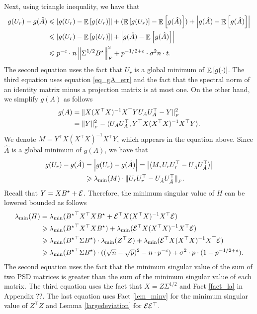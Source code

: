 	Next, using triangle inequality, we have that
	\begin{align}
		g(U_r) - g(\hat{A}) &\leqslant {\left| {g(U_r) - \mathop{\mathbb{E}}\left[ g(U_r) \right]} \right|} + (\mathop{\mathbb{E}}\left[ g(U_r) \right] - \mathop{\mathbb{E}}\left[ g(\hat{A}) \right]) + {\left| {g(\hat{A}) - \mathop{\mathbb{E}}\left[ g(\hat{A}) \right]} \right|} \nonumber \\
		&\leqslant {\left| {g(U_r) - \mathop{\mathbb{E}}\left[ g(U_r) \right]} \right|} +{\left| {g(\hat{A}) - \mathop{\mathbb{E}}\left[ g(\hat{A}) \right]} \right|} \nonumber \\
		&\leqslant p^{-c} \cdot n \left\| \Sigma^{1/2} B^{\star} \right\|_{F}^2 + p^{-1/2 + e}\cdot \sigma^2 n \cdot t. \label{eq_g_gap}
	\end{align}
	The second equation uses the fact that $U_r$ is a global minimum of $\mathop{\mathbb{E}}\left[ g(\cdot) \right]$.
	The third equation uses equation \eqref{eq_gA_err} and the fact that the spectral norm of an identity matrix minus a projection matrix is at most one.
	On the other hand, we simplify $g(A)$ as follows
	\begin{align*}
		g(A)  &= \|X (X^{\top}X)^{-1} X^{\top} Y U_A U_A^{\top} - Y\|_{_{F}}^2 \\
					&= \|Y\|_{_{F}}^2 - \langle U_A U_A^{\top}, Y^{\top} X (X^{\top} X)^{-1} X^{\top} Y \rangle.
	\end{align*}
	We denote $M = Y^{\top} X (X^{\top} X)^{-1} X^{\top} Y$, which appears in the equation above.
	Since $\hat{A}$ is a global minimum of $g(A)$, we have that
	\begin{align}
		g(U_r) - g(\hat{A}) &= \left\lvert g(U_r) - g(\hat{A})\right\rvert = \left\lvert\langle M, U_r U_r^{\top} - U_{\hat{A}} U_{\hat{A}}^{\top} \rangle\right\rvert \nonumber \\
												&\geqslant \lambda_{\min}(M) \cdot \|U_r U_r^{\top} - U_{\hat{A}} U_{\hat{A}}^{\top}\|_{_{F}}. \label{eq_g_gap1}
	\end{align}
	Recall that $Y = X B^{\star} + \mathcal{E}$. Therefore, the minimum singular value of $H$ can be lowered bounded as follows
	\begin{align}
		\lambda_{\min}(H) &= \lambda_{\min}({B^{\star}}^{\top} X^{\top} X B^{\star} + \mathcal{E}^{\top} X (X^{\top} X)^{-1} X^{\top} \mathcal{E}) \nonumber \\
		&\geqslant \lambda_{\min}({B^{\star}}^{\top}X^{\top}X B^{\star}) + \lambda_{\min}(\mathcal{E}^{\top} X (X^{\top} X)^{-1} X^{\top} \mathcal{E}) \nonumber \\
		&\geqslant \lambda_{\min}({B^{\star}}^{\top}\Sigma B^{\star}) \cdot \lambda_{\min}(Z^{\top}Z) + \lambda_{\min}(\mathcal{E}^{\top} X (X^{\top} X)^{-1} X^{\top} \mathcal{E}) \nonumber \\
		&\geqslant \lambda_{\min}({B^{\star}}^{\top}\Sigma B^{\star}) \cdot ((\sqrt n - \sqrt p)^2 - n \cdot p^{-c}) + \sigma^2 \cdot p \cdot (1 - p^{-1/2 + {\mathit{e}}}). \label{eq_g_gap2}
	\end{align}
	The second equation uses the fact that the minimum singular value of the sum of two PSD matrices is greater than the sum of the minimum singular value of each matrix.
	The third equation uses the fact that $X = Z \Sigma^{1/2}$ and Fact \ref{fact_la} in Appendix ??.
	The last equation uses Fact \ref{lem_minv} for the minimum singular value of $Z^{\top}Z$ and Lemma \ref{largedeviation} for $\mathcal{E}\mathcal{E}^{\top}$.

